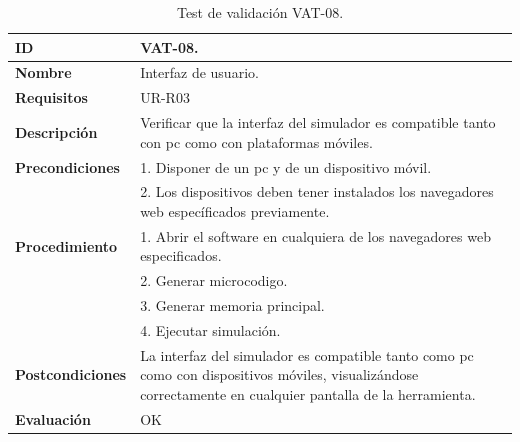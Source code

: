 \begin{center}
\begin{table}[htb]
\centering
\caption{Test de validación VAT-08.}
\begin{tabular}{@{}p{2.5cm} p{9cm}@{}} 
\toprule
\textbf{ID} 					& VAT-08. \\
\midrule
\textbf{Nombre} 				& Interfaz de usuario. \\
\midrule
\textbf{Requisitos} 		& UR-R03\\
\midrule
\textbf{Descripción} 		& Verificar que la interfaz del simulador es compatible tanto con \acrshort{pc} como con plataformas móviles. \\
\midrule
\textbf{Precondiciones}		& 1. Disponer de un \acrshort{pc} y de un dispositivo móvil. \\
											& 2. Los dispositivos deben tener instalados los navegadores web específicados previamente. \\
\midrule
\textbf{Procedimiento}			& 1. Abrir el \gls{software} en cualquiera de los navegadores web especificados. \\
							& 2. Generar \gls{microcodigo}.\\
							& 3. Generar memoria principal.\\
							& 4. Ejecutar simulación.\\
\midrule
\textbf{Postcondiciones} 		&  La interfaz del simulador es compatible tanto como \acrshort{pc} como con dispositivos móviles, visualizándose correctamente en cualquier pantalla de la herramienta.\\
\midrule
\textbf{Evaluación} 			& OK \\
\bottomrule
\end{tabular}
\label{tab:vat-08}
\end{table}
\end{center}


